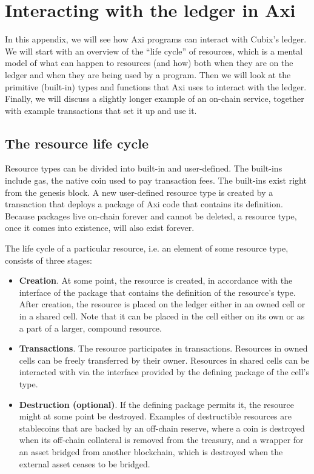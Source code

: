 \section{Interacting with the ledger in Axi}

In this appendix, we will see how Axi programs can interact with Cubix's ledger. We will start with an overview of the ``life cycle'' of resources, which is a mental model of what can happen to resources (and how) both when they are on the ledger and when they are being used by a program. Then we will look at the primitive (built-in) types and functions that Axi uses to interact with the ledger. Finally, we will discuss a slightly longer example of an on-chain service, together with example transactions that set it up and use it.

\subsection{The resource life cycle}

Resource types can be divided into built-in and user-defined. The built-ins include gas, the native coin used to pay transaction fees. The built-ins exist right from the genesis block. A new user-defined resource type is created by a transaction that deploys a package of Axi code that contains its definition. Because packages live on-chain forever and cannot be deleted, a resource type, once it comes into existence, will also exist forever.

The life cycle of a particular resource, i.e. an element of some resource type, consists of three stages:

\begin{itemize}
  \item \textbf{Creation}. At some point, the resource is created, in accordance with the interface of the package that contains the definition of the resource's type. After creation, the resource is placed on the ledger either in an owned cell or in a shared cell. Note that it can be placed in the cell either on its own or as a part of a larger, compound resource.
  \item \textbf{Transactions}. The resource participates in transactions. Resources in owned cells can be freely transferred by their owner. Resources in shared cells can be interacted with via the interface provided by the defining package of the cell's type.
  \item \textbf{Destruction (optional)}. If the defining package permits it, the resource might at some point be destroyed. Examples of destructible resources are stablecoins that are backed by an off-chain reserve, where a coin is destroyed when its off-chain collateral is removed from the treasury, and a wrapper for an asset bridged from another blockchain, which is destroyed when the external asset ceases to be bridged.
\end{itemize}

